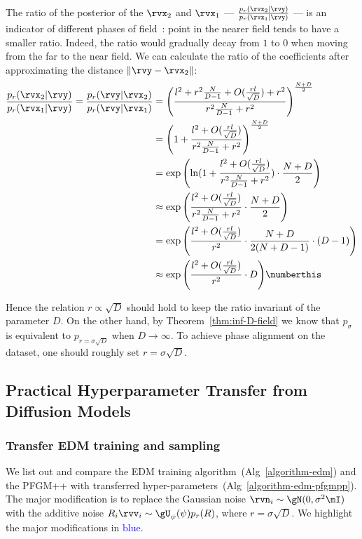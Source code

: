 The ratio of the posterior of the $\rvx_2$ and $\rvx_1$  --- $\frac{p_r(\rvx_2|\rvy)}{p_r(\rvx_1|\rvy)}$ ---  is an indicator of different phases of field~\cite{Xu2023StableTF}: point in the nearer field tends to have a smaller ratio. Indeed, the ratio would gradually decay from $1$ to $0$ when moving from the far to the near field.  We can calculate the ratio of the coefficients after approximating the distance $\|\rvy-\rvx_2\|$:
\begin{align*}
    \frac{p_r(\rvx_2|\rvy)}{p_r(\rvx_1|\rvy)}=\frac{p_r(\rvy|\rvx_2)}{p_r(\rvy|\rvx_1)} &=  \left(\frac{l^2+r^2\frac{N}{D-1}+O(\frac{rl}{\sqrt{D}})+r^2}{r^2\frac{N}{D-1}+r^2}\right)^{\frac{N+D}{2}}\\
    &=\left(1 + \frac{l^2+O(\frac{rl}{\sqrt{D}})}{r^2\frac{N}{D-1}+r^2}\right)^{\frac{N+D}{2}}\\
    & = \exp{\left({\rm ln}(1+\frac{l^2+O(\frac{rl}{\sqrt{D}})}{r^2\frac{N}{D-1}+r^2})\cdot \frac{N+D}{2}\right)}\\
    & \approx \exp{\left(\frac{l^2+O(\frac{rl}{\sqrt{D}})}{r^2\frac{N}{D-1}+r^2} \cdot\frac{N+D}{2}\right)}\\
    &= \exp{\left(\frac{l^2+O(\frac{rl}{\sqrt{D}})}{r^2} \cdot\frac{N+D}{2(N+D-1)}\cdot(D-1)\right)}\\
    &\approx \exp{\left(\frac{l^2+O(\frac{rl}{\sqrt{D}})}{r^2}\cdot D\right)}\numberthis \label{eq:ratio}
\end{align*}

Hence the relation $r\propto \sqrt{D}$ should hold to keep the ratio invariant of the parameter $D$. On the other hand, by Theorem~\ref{thm:inf-D-field} we know that $p_{\sigma}$ is equivalent to $p_{r=\sigma\sqrt{D}}$ when $D\to \infty$. To achieve phase alignment on the dataset, one should roughly set $r=\sigma\sqrt{D}$.

\subsection{Practical Hyperparameter Transfer from Diffusion Models}
\label{app:transfer-diff}

\subsubsection{Transfer EDM training and sampling}

We list out and compare the EDM training algorithm~(Alg~\ref{algorithm-edm}) and the PFGM++ with transferred hyper-parameters~(Alg~\ref{algorithm-edm-pfgmpp}). The major modification is to replace the Gaussian noise $\rvn_i\sim \gN(0, \sigma^2 \mI)$ with the additive noise $R_i \rvv_i\sim \gU_{\psi}(\psi)p_r(R)$, where $r=\sigma\sqrt{D}$. We highlight the major modifications in \textcolor{blue}{blue}.

